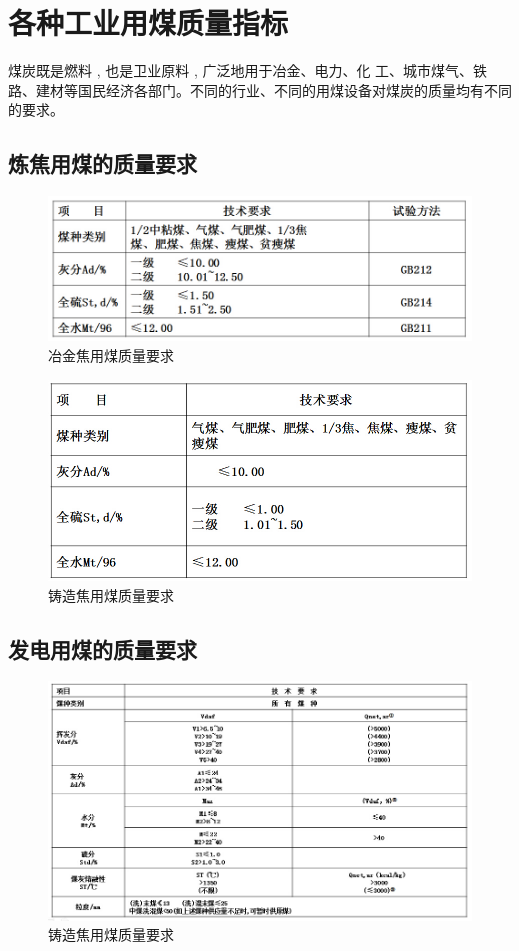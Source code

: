 \documentclass[10pt,openany]{ctexbook}
\begin{document}
\section{各种工业用煤质量指标}
煤炭既是燃料 , 也是卫业原料 , 广泛地用于冶金、电力、化 工、城市煤气、铁路、建材等国民经济各部门。不同的行业、不同的用煤设备对煤炭的质量均有不同的要求。
\subsection{炼焦用煤的质量要求}
 \begin{figure}[!ht]
\includegraphics[scale=0.6]{11}
\caption{冶金焦用煤质量要求 }
\end{figure}


 \begin{figure}[!ht]
\includegraphics[scale=0.66]{12}
\caption{铸造焦用煤质量要求 }
\end{figure}
\subsection{发电用煤的质量要求}
 \begin{figure}[!ht]
\includegraphics[scale=0.6]{13}
\caption{铸造焦用煤质量要求 }
\end{figure}
\end{document}
